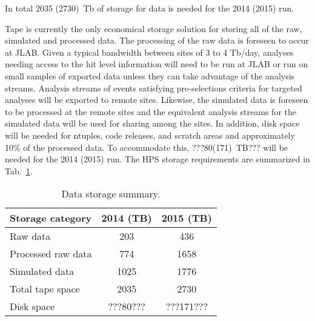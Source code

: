 In total 2035 (2730)~Tb of storage for data is needed for the 2014 (2015) run.

Tape is currently the only economical storage
solution for storing all of the raw, simulated and processed data.
The processing of the raw data is foreseen to occur at JLAB. Given a
typical bandwidth between sites of 3 to 4 Tb/day, analyses needing
access to the hit level information will need to be run at JLAB or run
on small samples of exported data unless they can take advantage of the
analysis streams. Analysis streams of events satisfying
pre-selections criteria for targeted analyses will be exported to remote
sites. Likewise, the simulated data is foreseen to be processed at the
remote sites and the equivalent analysis streams for the simulated data
will be used for sharing among the sites. In addition, disk space will be 
needed for ntuples, code releases, and scratch areas and approximately 10\% of the 
processed data. To accommodate this, ???80(171)~TB??? will be needed for the 2014 (2015) run. 
The HPS storage requirements are summarized in Tab.~\ref{tab:datastorage}.
\begin{table}[tbp]
\centering
\begin{tabular}{|l|c|c|}
\hline
Storage category & 2014 (TB) & 2015 (TB) \\
\hline
Raw data & 203 & 436 \\
Processed raw data & 774 & 1658 \\
Simulated data & 1025 & 1776 \\
\hline
Total tape space & 2035 & 2730 \\
\hline
Disk space  & ???80???  & ???171??? \\
\hline
\end{tabular}
\caption{{\small Data storage summary.}}
\label{tab:datastorage}
\end{table}


